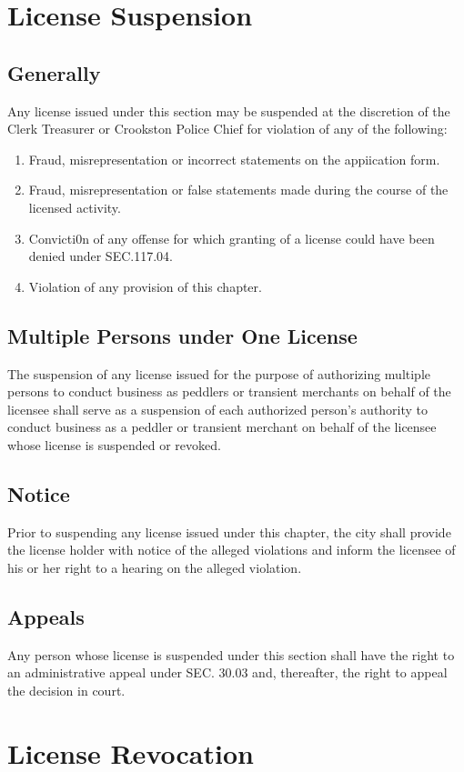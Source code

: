\section{License Suspension}
\subsection{Generally}
Any license issued under this section may be suspended at the discretion of the Clerk Treasurer or Crookston Police Chief for violation of any of the following:
\begin{enumerate}[{\indent}1)]
    \item Fraud, misrepresentation or incorrect statements on the appiication form.
    \item Fraud, misrepresentation or false statements made during the course of the licensed activity.
    \item Convicti0n of any offense for which granting of a license could have been denied under SEC.117.04.
    \item Violation of any provision of this chapter.
\end{enumerate}
\subsection{Multiple Persons under One License}
The suspension of any license issued for the purpose of authorizing multiple persons to conduct business as peddlers or transient merchants on behalf of the licensee shall serve as a suspension of each authorized person's authority to conduct business as a peddler or transient merchant on behalf of the licensee whose license is suspended or revoked.
\subsection{Notice}
Prior to suspending any license issued under this chapter, the city shall provide the license holder with notice of the alleged violations and inform the licensee of his or her right to a hearing on the alleged violation.
\subsection{Appeals}
Any person whose license is suspended under this section shall have the right to an administrative appeal under SEC. 30.03 and, thereafter, the right to appeal the decision in court.

\section{License Revocation}
